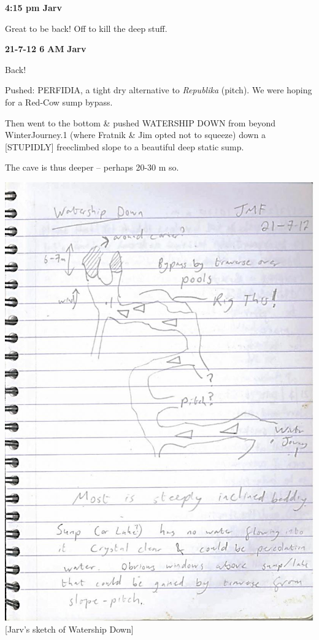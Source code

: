 \textbf{4:15 pm Jarv}

Great to be back! Off to kill the deep stuff.

\textbf{21-7-12 6} \textbf{AM} \textbf{Jarv}

Back!

Pushed: PERFIDIA, a tight dry alternative to \emph{Republika} (pitch).
We were hoping for a Red-Cow sump bypass.

Then went to the bottom \& pushed WATERSHIP DOWN from beyond
WinterJourney.1 (where Fratnik \& Jim opted not to squeeze) down a
{[}STUPIDLY{]} freeclimbed slope to a beautiful deep static sump.

The cave is thus deeper -- perhaps 20-30 m so.

\includegraphics{UgLog1012/63.jpeg}\\
{[}Jarv's sketch of Watership Down{]}

